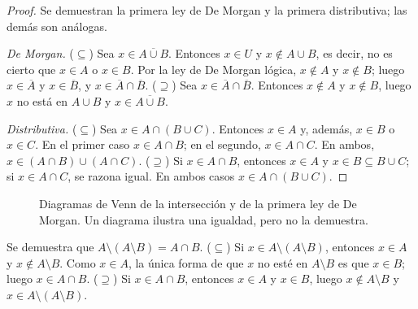 \begin{proof}
Se demuestran la primera ley de De Morgan y la primera distributiva; las demás son análogas.

\emph{De Morgan.} ($\subseteq$) Sea $x\in\overline{A\cup B}$. Entonces $x\in U$ y $x\notin A\cup B$, es decir, no es cierto que $x\in A$ o $x\in B$. Por la ley de De Morgan lógica, $x\notin A$ y $x\notin B$; luego $x\in\overline{A}$ y $x\in\overline{B}$, y $x\in\overline{A}\cap\overline{B}$. ($\supseteq$) Sea $x\in\overline{A}\cap\overline{B}$. Entonces $x\notin A$ y $x\notin B$, luego $x$ no está en $A\cup B$ y $x\in\overline{A\cup B}$.

\emph{Distributiva.} ($\subseteq$) Sea $x\in A\cap(B\cup C)$. Entonces $x\in A$ y, además, $x\in B$ o $x\in C$. En el primer caso $x\in A\cap B$; en el segundo, $x\in A\cap C$. En ambos, $x\in(A\cap B)\cup(A\cap C)$. ($\supseteq$) Si $x\in A\cap B$, entonces $x\in A$ y $x\in B\subseteq B\cup C$; si $x\in A\cap C$, se razona igual. En ambos casos $x\in A\cap(B\cup C)$.
\end{proof}

\begin{figure}[h]
\centering
{}
\caption{Diagramas de Venn de la intersección y de la primera ley de De Morgan. Un diagrama ilustra una igualdad, pero no la demuestra.}
\label{fig:t1-venn}
\end{figure}

\begin{ejemplo}\label{ej:t1-doble}
Se demuestra que $A\setminus(A\setminus B)=A\cap B$. ($\subseteq$) Si $x\in A\setminus(A\setminus B)$, entonces $x\in A$ y $x\notin A\setminus B$. Como $x\in A$, la única forma de que $x$ no esté en $A\setminus B$ es que $x\in B$; luego $x\in A\cap B$. ($\supseteq$) Si $x\in A\cap B$, entonces $x\in A$ y $x\in B$, luego $x\notin A\setminus B$ y $x\in A\setminus(A\setminus B)$.
\end{ejemplo}

